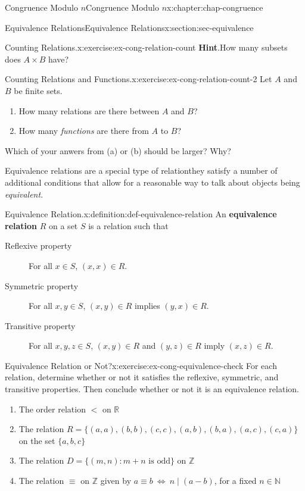 \documentclass[oneside,10pt,]{book}
\newcommand{\blocktitlefont}{\relax}
\newcommand{\terminology}[1]{\textbf{#1}}
\numberwithin{equation}{section}
\newcommand{\lt}{<}
\begin{document}
\begin{chapterptx}{Congruence Modulo \(n\)}{}{Congruence Modulo \(n\)}{}{}{x:chapter:chap-congruence}
\begin{sectionptx}{Equivalence Relations}{}{Equivalence Relations}{}{}{x:section:sec-equivalence}
\begin{inlineexercise}{Counting Relations.}{x:exercise:ex-cong-relation-count}
\noindent\textbf{\blocktitlefont Hint}.\hypertarget{g:hint:id259330}{}\quad{}How many subsets does \(A \times B\) have?%
\end{inlineexercise}
\begin{inlineexercise}{Counting Relations and Functions.}{x:exercise:ex-cong-relation-count-2}%
Let \(A\) and \(B\) be finite sets.%
\begin{enumerate}[label=(\alph*)]
\item{}How many relations are there between \(A\) and \(B\)?%
\item{}How many \emph{functions} are there from \(A\) to \(B\)?%
\end{enumerate}
Which of your anwers from (a) or (b) should be larger? Why?%
\end{inlineexercise}
Equivalence relations are a special type of relation\textemdash{}they satisfy a number of additional conditions that allow for a reasonable way to talk about objects being \emph{equivalent}.%
\begin{definition}{Equivalence Relation.}{x:definition:def-equivalence-relation}%
An \terminology{equivalence relation} \(R\) on a set \(S\) is a relation such that%
\begin{description}
\item[{Reflexive property}]For all \(x \in S\), \((x,x) \in R\).%
\item[{Symmetric property}]For all \(x, y \in S\), \((x,y) \in R\) implies \((y,x) \in R\).%
\item[{Transitive property}]For all \(x, y, z \in S\), \((x,y) \in R\) and \((y,z) \in R\) imply \((x,z) \in R\).%
\end{description}
%
\end{definition}
\begin{inlineexercise}{Equivalence Relation or Not?}{x:exercise:ex-cong-equivalence-check}%
For each relation, determine whether or not it satisfies the reflexive, symmetric, and transitive properties. Then conclude whether or not it is an equivalence relation.%
\begin{enumerate}[label=(\alph*)]
\item{}The order relation \(\lt\) on \(\mathbb{R}\)%
\item{}The relation \(R = \{(a,a),(b,b),(c,c),(a,b),(b,a),(a,c),(c,a)\}\) on the set \(\{a,b,c\}\)%
\item{}The relation \(D = \{(m,n): m + n \text{ is odd} \}\) on \(\mathbb{Z}\)%
\item{}The relation \(\equiv\) on \(\mathbb{Z}\) given by \(a \equiv b \ \Leftrightarrow \ n \mid (a-b)\), for a fixed \(n \in \mathbb{N}\)%

\end{enumerate}
\end{inlineexercise}
\end{sectionptx}
\end{chapterptx}
\end{document}
